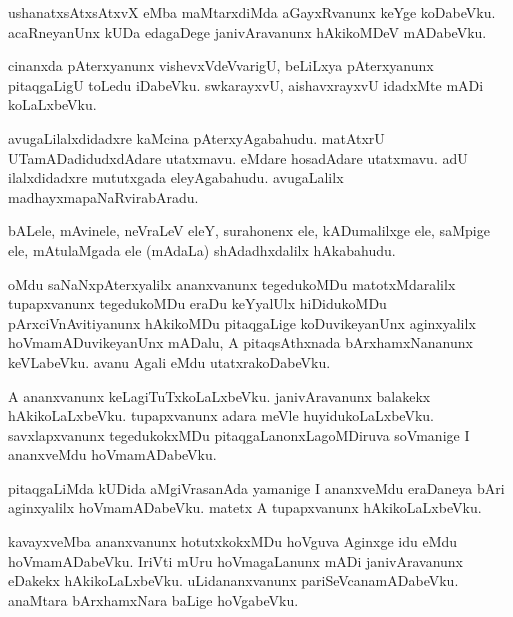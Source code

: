 \documentclass{article}
\begin{document}
\begin{mn}
ushanatxsAtxsAtxvX  eMba  maMtarxdiMda  aGayxRvanunx  keYge  koDabeVku.  acaRneyanUnx  kUDa  edagaDege  janivAravanunx  
hAkikoMDeV  mADabeVku.
\end{mn}

\begin{mn}
cinanxda  pAterxyanunx  vishevxVdeVvarigU,  beLiLxya  pAterxyanunx  pitaqgaLigU  toLedu  iDabeVku.  swkarayxvU,  aishavxrayxvU  
idadxMte  mADi  koLaLxbeVku.
\end{mn}

\begin{mn}
avugaLilalxdidadxre  kaMcina  pAterxyAgabahudu.  matAtxrU  UTamADadidudxdAdare  utatxmavu.  eMdare  hosadAdare  
utatxmavu.  adU  ilalxdidadxre  mututxgada  eleyAgabahudu.  avugaLalilx  madhayxmapaNaRvirabAradu.
\end{mn}

\begin{mn}
bALele,  mAvinele,  neVraLeV  eleY,  surahonenx  ele,  kADumalilxge ele,  saMpige ele,  mAtulaMgada ele  (mAdaLa) 
shAdadhxdalilx  hAkabahudu.
\end{mn}

\begin{mn}
oMdu  saNaNxpAterxyalilx  ananxvanunx  tegedukoMDu  matotxMdaralilx  tupapxvanunx  tegedukoMDu  eraDu  keYyalUlx  
hiDidukoMDu  pArxciVnAvitiyanunx  hAkikoMDu  pitaqgaLige  koDuvikeyanUnx  aginxyalilx  hoVmamADuvikeyanUnx  mADalu,  
A  pitaqsAthxnada  bArxhamxNananunx  keVLabeVku.  avanu  Agali  eMdu  utatxrakoDabeVku.
\end{mn}

\begin{mn}
A  ananxvanunx  keLagiTuTxkoLaLxbeVku.  janivAravanunx  balakekx  hAkikoLaLxbeVku.  tupapxvanunx  adara  meVle  
huyidukoLaLxbeVku.  savxlapxvanunx  tegedukokxMDu  pitaqgaLanonxLagoMDiruva  soVmanige  I  ananxveMdu  hoVmamADabeVku.
\end{mn}

\begin{mn}
pitaqgaLiMda  kUDida  aMgiVrasanAda  yamanige  I  ananxveMdu  eraDaneya  bAri  aginxyalilx  hoVmamADabeVku.  matetx  
A  tupapxvanunx  hAkikoLaLxbeVku.
\end{mn}

\begin{mn}
kavayxveMba  ananxvanunx  hotutxkokxMDu  hoVguva  Aginxge  idu  eMdu  hoVmamADabeVku.  IriVti  mUru  hoVmagaLanunx  mADi  
janivAravanunx  eDakekx  hAkikoLaLxbeVku.  uLidananxvanunx  pariSeVcanamADabeVku.  anaMtara  bArxhamxNara  baLige  hoVgabeVku.
\end{mn}
\end{document}
